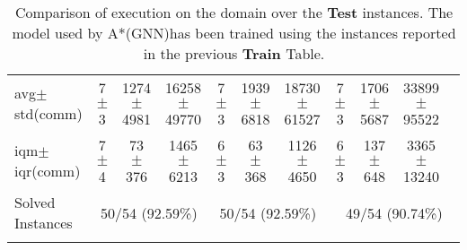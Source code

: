 \documentclass{article}
\newcommand{\GNNres}{A*(GNN)}
\newcommand{\myAvg}{avg}
\newcommand{\myStd}{std}
\newcommand{\IQM}{iqm}
\newcommand{\IQR}{iqr}
\newcommand{\onlyInCommon}{comm}
\begin{document}
\begin{longtable}[!ht]{l|ccc|ccc|cccc}
\myAvg  $\pm$ \myStd \hfill (\onlyInCommon) & 7 $\pm$ 3 & 1274 $\pm$ 4981 & 16258 $\pm$ 49770 & 7 $\pm$ 3 & 1939 $\pm$ 6818 & 18730 $\pm$ 61527 & 7 $\pm$ 3 & 1706 $\pm$ 5687 & 33899 $\pm$ 95522 &  \\
\IQM $\pm$ \IQR \hfill (\onlyInCommon) & 7 $\pm$ 4 & 73 $\pm$ 376 & 1465 $\pm$ 6213 & 6 $\pm$ 3 & 63 $\pm$ 368 & 1126 $\pm$ 4650 & 6 $\pm$ 3 & 137 $\pm$ 648 & 3365 $\pm$ 13240 &  \\
Solved Instances & \multicolumn{3}{c|}{50/54 (92.59\%)} & \multicolumn{3}{c|}{50/54 (92.59\%)} & \multicolumn{4}{c}{49/54 (90.74\%)}
\\
\caption{Comparison of execution on the {} domain over the \textbf{Test} instances. The model used by \GNNres has been trained using the instances reported in the previous \textbf{Train} Table.}
\label{tab:{final_reports}_{}_comparison_test}
\end{longtable}
\end{document}
